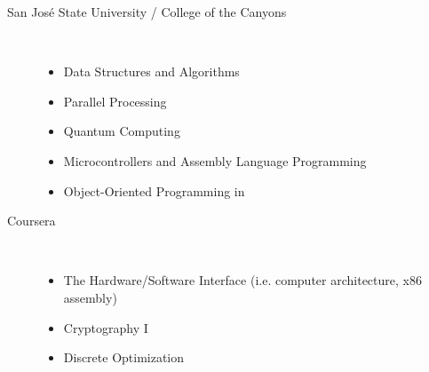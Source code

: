 \documentclass[10pt]{article}
\begin{document}
\begin{multicols}{2}
	\begin{description}
		\item[\hspace{1em} San Jos\'{e} State University / College of the Canyons]{ \hfill \\[-1.5em]
		\begin{itemize}
			\item{Data Structures and Algorithms}
			\item{Parallel Processing}
			\item{Quantum Computing}
			\item{Microcontrollers and Assembly Language Programming}
			\item{Object-Oriented Programming in \CPP}
		\end{itemize}
		}
	\end{description}
	\begin{description}
		\item[\hspace{1em} Coursera]{ \hfill \\[-1.5em]
		\begin{itemize}
			\item{The Hardware/Software Interface (i.e. computer architecture, x86 assembly)}
			\item{Cryptography I}
			\item{Discrete Optimization}
		\end{itemize}
		}
	\end{description}
\end{multicols}
\end{document}

